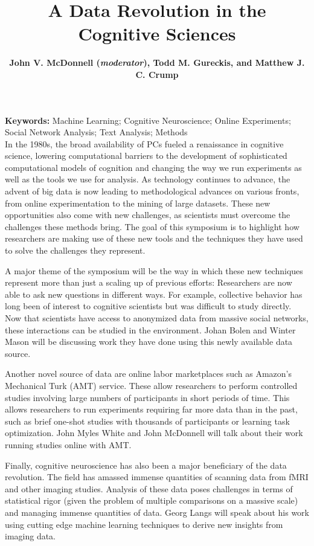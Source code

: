 \documentclass[10pt,letterpaper]{article}
\title{A Data Revolution in the Cognitive Sciences}
\author{{\large \bf John V. McDonnell (\emph{moderator}), Todd M. Gureckis,
and
Matthew J. C. Crump}
  \AND {\large \bf Johan Bolen} 
  \AND {\large \bf Georg Langs} 
  \AND {\large \bf Winter Mason, Meeyoung Cha, Krishna Gummadi, Farshad Kooti, and Haeryun Yang}
  \AND {\large \bf John Myles White} }
\begin{document}
\maketitle


\textbf{Keywords:} 
Machine Learning; Cognitive Neuroscience; Online Experiments; Social Network
Analysis; Text Analysis; Methods\\

In the 1980s, the broad availability of PCs fueled a renaissance in cognitive
science, lowering computational barriers to the development of sophisticated
computational models of cognition and changing the way we run experiments as well
as the tools we use for analysis. As technology continues to advance, the advent
of big data is now leading to methodological advances on various fronts, from
online experimentation to the mining of large datasets. These new opportunities
also come with new challenges, as scientists must overcome the challenges these
methods bring. The goal of this symposium is to highlight how researchers are
making use of these new tools and the techniques they have used to solve the
challenges they represent. 

A major theme of the symposium will be the way in which these new techniques
represent more than just a scaling up of previous efforts: Researchers are now
able to ask new questions in different ways. For example, collective behavior has
long been of interest to cognitive scientists but was difficult to study
directly. Now that scientists have access to anonymized data from massive social
networks, these interactions can be studied in the environment. Johan Bolen and
Winter Mason will be discussing work they have done using this newly available
data source.

Another novel source of data are online labor marketplaces such as Amazon's
Mechanical Turk (AMT) service. These allow researchers to perform controlled
studies involving large numbers of participants in short periods of time. This
allows researchers to run experiments requiring far more data than in the past,
such as brief one-shot studies with thousands of participants or learning task
optimization. John Myles White and John McDonnell will talk about their work
running studies online with AMT.

Finally, cognitive neuroscience has also been a major beneficiary of the data
revolution.  The field has amassed immense quantities of scanning data from fMRI
and other imaging studies.  Analysis of these data poses challenges in terms of
statistical rigor (given the problem of multiple comparisons on a massive scale)
and managing immense quantities of data. Georg Langs will speak about his work
using cutting edge machine learning techniques to derive new insights from
imaging data.
\end{document}
